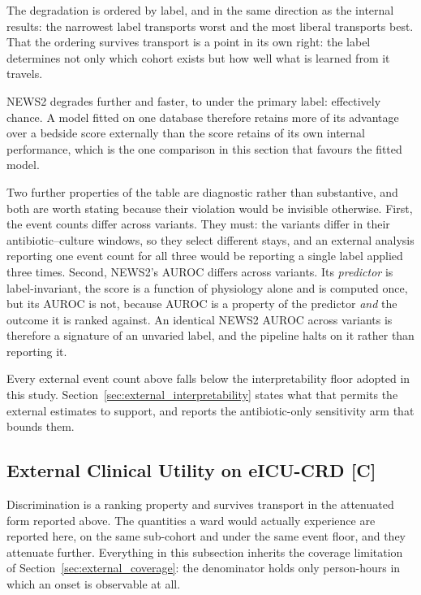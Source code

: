 The degradation is ordered by label, and in the same direction as the internal
results: the narrowest label transports worst and the most liberal transports
best. That the ordering survives transport is a point in its own right: the
label determines not only which cohort exists but how well what is learned from
it travels.

NEWS2 degrades further and faster, to \pcExtAurocNewsB{} under the primary
label: effectively chance. A model fitted on one database therefore retains
more of its advantage over a bedside score externally than the score retains of
its own internal performance, which is the one comparison in this section that
favours the fitted model.

Two further properties of the table are diagnostic rather than substantive, and
both are worth stating because their violation would be invisible otherwise.
First, the event counts differ across variants. They must: the variants differ
in their antibiotic--culture windows, so they select different stays, and an
external analysis reporting one event count for all three would be reporting a
single label applied three times. Second, NEWS2's AUROC differs across
variants. Its \emph{predictor} is label-invariant, the score is a function of
physiology alone and is computed once, but its AUROC is not, because AUROC is
a property of the predictor \emph{and} the outcome it is ranked against. An
identical NEWS2 AUROC across variants is therefore a signature of an unvaried
label, and the pipeline halts on it rather than reporting it.

Every external event count above falls below the interpretability floor adopted
in this study. Section~\ref{sec:external_interpretability} states what that
permits the external estimates to support, and reports the antibiotic-only
sensitivity arm that bounds them.

\subsection{External Clinical Utility on eICU-CRD \texorpdfstring{[C]}{[C]}}

Discrimination is a ranking property and survives transport in the attenuated
form reported above. The quantities a ward would actually experience are
reported here, on the same sub-cohort and under the same event floor, and they
attenuate further. Everything in this subsection inherits the coverage
limitation of Section~\ref{sec:external_coverage}: the denominator holds only
person-hours in which an onset is observable at all.

